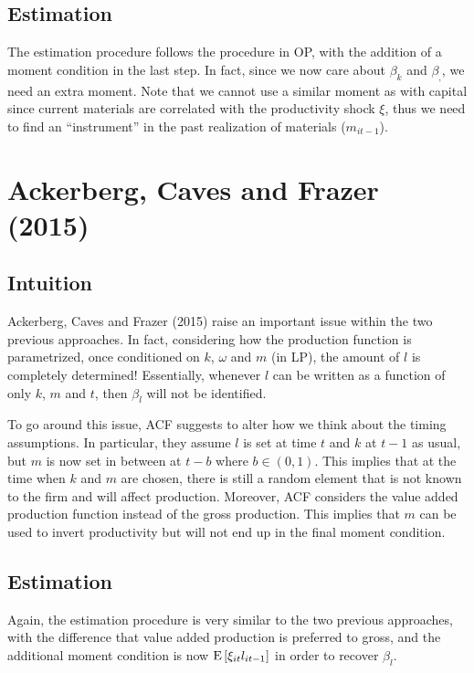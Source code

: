 \subsection{Estimation}

The estimation procedure follows the procedure in OP, with the addition of a moment condition in the last step. In fact, since we now care about $\beta_k$ and $\beta_,$, we need an extra moment. Note that we cannot use a similar moment as with capital since current materials are correlated with the productivity shock $\xi$, thus we need to find an ``instrument'' in the past realization of materials ($m_{it-1}$).

\section{Ackerberg, Caves and Frazer (2015)}

\subsection{Intuition}

Ackerberg, Caves and Frazer (2015) raise an important issue within the two previous approaches. In fact, considering how the production function is parametrized, once conditioned on $k$, $\omega$ and $m$ (in LP), the amount of $l$ is completely determined! Essentially, whenever $l$ can be written as a function of only $k$, $m$ and $t$, then $\beta_l$ will not be identified.

To go around this issue, ACF suggests to alter how we think about the timing assumptions. In particular, they assume $l$ is set at time $t$ and $k$ at $t-1$ as usual, but $m$ is now set in between at $t-b$ where $b\in (0, 1)$. This implies that at the time when $k$ and $m$ are chosen, there is still a random element that is not known to the firm and will affect production. Moreover, ACF considers the value added production function instead of the gross production. This implies that $m$ can be used to invert productivity but will not end up in the final moment condition.

\subsection{Estimation}

Again, the estimation procedure is very similar to the two previous approaches, with the difference that value added production is preferred to gross, and the additional moment condition is now $\operatorname{E}\left[\xi_{it}l_{it-1}\right]$ in order to recover $\beta_l$.


